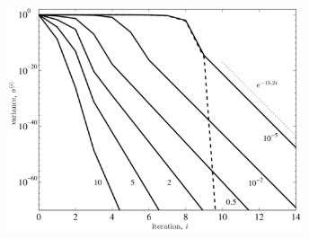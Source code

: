 \documentclass[12pt,t]{beamer}
\begin{document}
\begin{frame}
\begin{center}
\includegraphics[width=0.65\textwidth]{catmap}
\end{center}
\end{frame}
\end{document}
